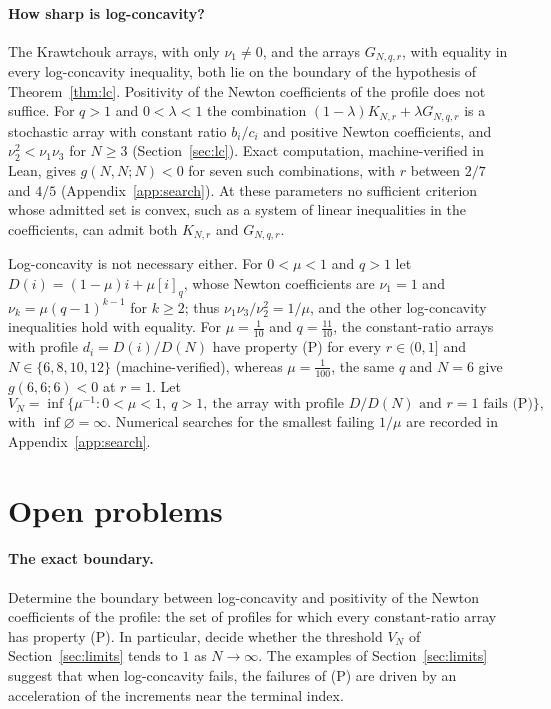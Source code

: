 \paragraph{How sharp is log-concavity?}
The Krawtchouk arrays, with only $\nu_1\neq0$, and the arrays $G_{N,q,r}$, with equality in every log-concavity inequality, both lie on the boundary of the hypothesis of Theorem~\ref{thm:lc}. Positivity of the Newton coefficients of the profile does not suffice. For $q>1$ and $0<\lambda<1$ the combination $(1-\lambda)K_{N,r}+\lambda G_{N,q,r}$ is a stochastic array with constant ratio $b_i/c_i$ and positive Newton coefficients, and $\nu_2^2<\nu_1\nu_3$ for $N\geq3$ (Section~\ref{sec:lc}). Exact computation, machine-verified in Lean, gives $g(N,N;N)<0$ for seven such combinations, with $r$ between $2/7$ and $4/5$ (Appendix~\ref{app:search}). At these parameters no sufficient criterion whose admitted set is convex, such as a system of linear inequalities in the coefficients, can admit both $K_{N,r}$ and $G_{N,q,r}$.

Log-concavity is not necessary either. For $0<\mu<1$ and $q>1$ let $D(i)=(1-\mu)i+\mu[i]_q$, whose Newton coefficients are $\nu_1=1$ and $\nu_k=\mu(q-1)^{k-1}$ for $k\geq2$; thus $\nu_1\nu_3/\nu_2^2=1/\mu$, and the other log-concavity inequalities hold with equality. For $\mu=\frac1{10}$ and $q=\frac{11}{10}$, the constant-ratio arrays with profile $d_i=D(i)/D(N)$ have property (P) for every $r\in(0,1]$ and $N\in\{6,8,10,12\}$ (machine-verified), whereas $\mu=\frac1{100}$, the same $q$ and $N=6$ give $g(6,6;6)<0$ at $r=1$. Let
\[
V_N=\inf\{\mu^{-1}:0<\mu<1,\ q>1,\ \text{the array with profile }D/D(N)\text{ and }r=1\text{ fails (P)}\},
\]
with $\inf\varnothing=\infty$. Numerical searches for the smallest failing $1/\mu$ are recorded in Appendix~\ref{app:search}.

\section{Open problems}\label{sec:open}

\paragraph{The exact boundary.} Determine the boundary between log-concavity and positivity of the Newton coefficients of the profile: the set of profiles for which every constant-ratio array has property (P). In particular, decide whether the threshold $V_N$ of Section~\ref{sec:limits} tends to $1$ as $N\to\infty$. The examples of Section~\ref{sec:limits} suggest that when log-concavity fails, the failures of (P) are driven by an acceleration of the increments near the terminal index.


